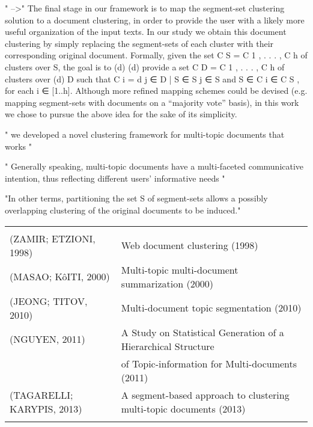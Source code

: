 " -->"
The final stage in our framework is to map the segment-set clustering solution to a document clustering, in order to provide the user with a likely more useful organization of the input texts. In our study we obtain this document clustering by simply replacing the segment-sets of each cluster with their corresponding original document. Formally, given the set C S = {C 1 , . . . , C h } of clusters over S, the goal is to (d) (d) provide a set C D = {C 1 , . . . , C h } of clusters over (d) D such that C i = {d j ∈ D | S ∈ S j ∈ S and S ∈ C i ∈ C S }, for each i ∈ [1..h].  Although more refined mapping schemes could be devised (e.g. mapping segment-sets with documents on a “majority vote” basis), in this work we chose to pursue the above idea for the sake of its simplicity.



" we developed a novel clustering framework for multi-topic documents that works "

" Generally speaking, multi-topic documents have a multi-faceted communicative intention, thus reflecting different users’ informative needs "


"In other terms, partitioning the set S of segment-sets allows a possibly overlapping clustering of the original documents to be induced."

















\begin{table}[!h]
	\centering

	\begin{tabular}{ll} \hline\\
		(ZAMIR; ETZIONI, 1998) &      Web document clustering (1998)   \\ 
		(MASAO; KôITI, 2000) &        Multi-topic multi-document summarization  (2000)  \\ 
		(JEONG; TITOV, 2010) &        Multi-document topic segmentation (2010)  \\ 
		(NGUYEN, 2011) &              A Study on Statistical Generation of a Hierarchical Structure \\ & of Topic-information for Multi-documents (2011)  \\
		(TAGARELLI; KARYPIS, 2013) &  A segment-based approach to clustering multi-topic documents (2013) \\ \\ \hline
	\end{tabular}
\end{table}



